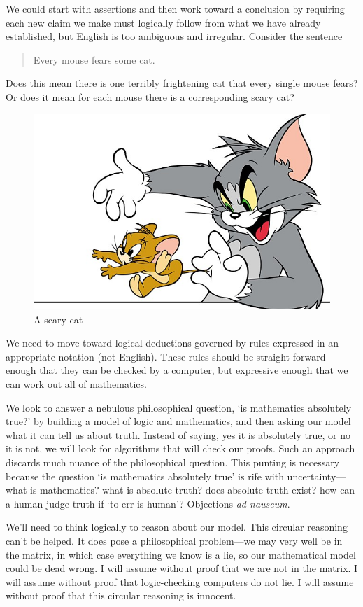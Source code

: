 \documentclass{scrbook}
\begin{document}
We could start with assertions and then work toward a conclusion by requiring each new claim we make must logically follow from what we have already established, but English is too ambiguous and irregular. Consider the sentence
\begin{quote}
  Every mouse fears some cat.
\end{quote}
Does this mean there is one terribly frightening cat that every single mouse fears? Or does it mean for each mouse there is a corresponding scary cat? \cite{wiki:cat-gen}
\begin{figure}
  \centering
  \includegraphics[width=\textwidth]{images/tom-jerry}
  \caption{A scary cat }
\end{figure}

We need to move toward logical deductions governed by rules expressed in an appropriate notation (not English). These rules should be straight-forward enough that they can be checked by a computer, but expressive enough that we can work out all of mathematics.

We look to answer a nebulous philosophical question, `is mathematics absolutely true?' by building a model of logic and mathematics, and then asking our model what it can tell us about truth. Instead of saying, yes it is absolutely true, or no it is not, we will look for algorithms that will check our proofs. Such an approach discards much nuance of the philosophical question. This punting is necessary because the question `is mathematics absolutely true' is rife with uncertainty---what is mathematics? what is absolute truth? does absolute truth exist? how can a human judge truth if `to err is human'? Objections \emph{ad nauseum}.  

We'll need to think logically to reason about our model. This circular reasoning can't be helped. It does pose a philosophical problem---we may very well be in the matrix, in which case everything we know is a lie, so our mathematical model could be dead wrong. I will assume without proof that we are not in the matrix. I will assume without proof that logic-checking computers do not lie. I will assume without proof that this circular reasoning is innocent. 
\end{document}
